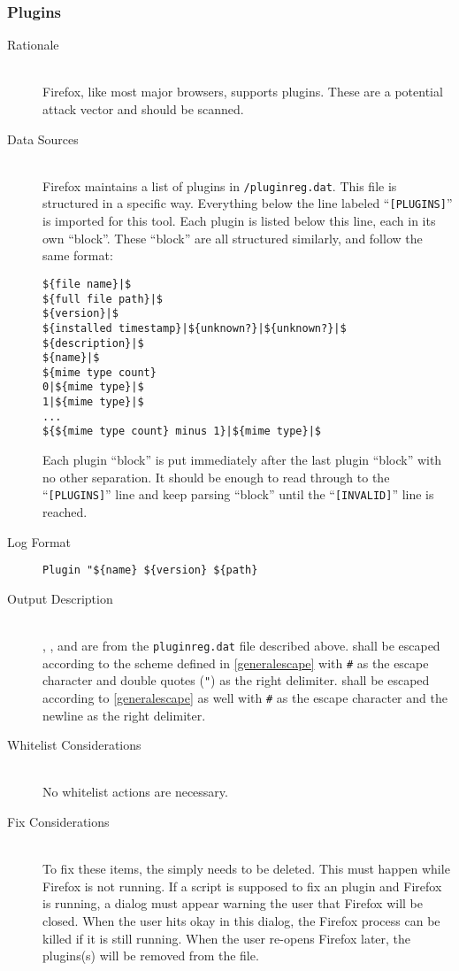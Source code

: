 \subsubsection{Plugins}
\begin{description}
\item[Rationale] \hfill \\
Firefox, like most major browsers, supports plugins.  These are a potential
attack vector and should be scanned.  
\item[Data Sources] \hfill \\
Firefox maintains a list of plugins in \texttt{/pluginreg.dat}.
This file is structured in a specific way.  Everything below the line labeled
``\texttt{[PLUGINS]}'' is imported for this tool.  Each plugin is listed below
this line, each in its own ``block''.  These ``block'' are all structured
similarly, and follow the same format:
\begin{verbatim}
${file name}|$
${full file path}|$
${version}|$
${installed timestamp}|${unknown?}|${unknown?}|$
${description}|$
${name}|$
${mime type count}
0|${mime type}|$
1|${mime type}|$
...
${${mime type count} minus 1}|${mime type}|$
\end{verbatim}
Each plugin ``block'' is put immediately after the last plugin ``block'' with no
other separation.  It should be enough to read through to the
``\texttt{[PLUGINS]}'' line and keep parsing ``block'' until the
``\texttt{[INVALID]}'' line is reached.
\item[Log Format] \hfill 
\vspace{-\baselineskip}
\begin{verbatim}
Plugin "${name} ${version} ${path}
\end{verbatim}
\item[Output Description] \hfill \\
, , and  are from the \texttt{pluginreg.dat}
file described above.   shall be escaped according to the scheme
defined in \ref{generalescape} with \verb|#| as the escape character and double
quotes (\verb|"|) as the right delimiter.   shall be escaped
according to \ref{generalescape} as well with \verb|#| as the escape character
and the newline as the right delimiter.  
\item[Whitelist Considerations] \hfill \\
No whitelist actions are necessary.  
\item[Fix Considerations] \hfill \\
To fix these items, the  simply needs to be deleted.  This must
happen while Firefox is not running.  If a script is supposed to fix an
plugin and Firefox is running, a dialog must appear warning the user that
Firefox will be closed.  When the user hits okay in this dialog, the Firefox
process can be killed if it is still running.  When the user re-opens Firefox
later, the plugins(s) will be removed from the file.
\end{description}
